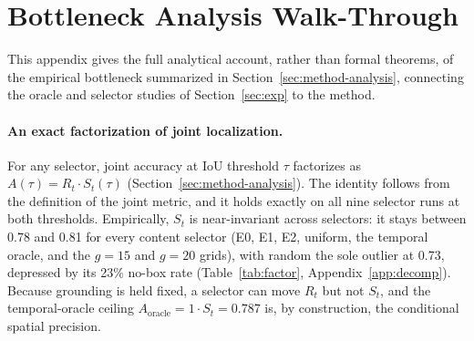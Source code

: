 \documentclass[10pt]{article}
\begin{document}
\section{Bottleneck Analysis Walk-Through}\label{app:analysis}

This appendix gives the full analytical account, rather than formal theorems, of the empirical bottleneck summarized in Section~\ref{sec:method-analysis}, connecting the oracle and selector studies of Section~\ref{sec:exp} to the method.

\paragraph{An exact factorization of joint localization.} For any selector, joint accuracy at IoU threshold $\tau$ factorizes as $A(\tau) = R_t \cdot S_t(\tau)$ (Section~\ref{sec:method-analysis}). The identity follows from the definition of the joint metric, and it holds exactly on all nine selector runs at both thresholds. Empirically, $S_t$ is near-invariant across selectors: it stays between 0.78 and 0.81 for every content selector (E0, E1, E2, uniform, the temporal oracle, and the $g=15$ and $g=20$ grids), with random the sole outlier at 0.73, depressed by its 23\% no-box rate (Table~\ref{tab:factor}, Appendix~\ref{app:decomp}). Because grounding is held fixed, a selector can move $R_t$ but not $S_t$, and the temporal-oracle ceiling $A_{\mathrm{oracle}} = 1 \cdot S_t = 0.787$ is, by construction, the conditional spatial precision.
\end{document}

